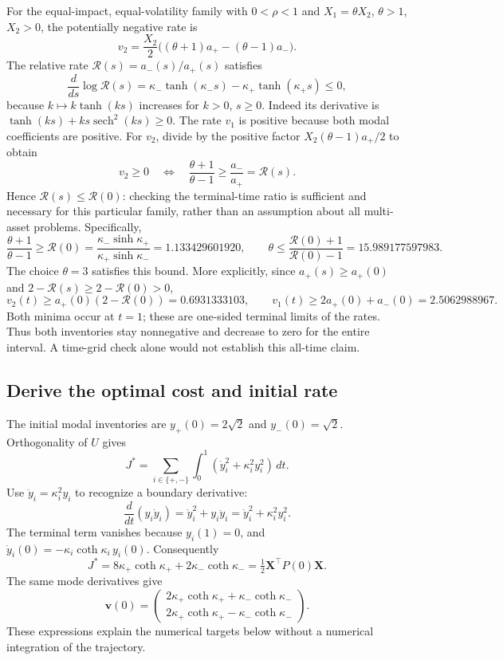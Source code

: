 \documentclass[11pt,a4paper]{article}
\begin{document}
For the equal-impact, equal-volatility family with $0<\rho<1$ and
$X_1=\theta X_2$, $\theta>1$, $X_2>0$, the potentially negative rate is
\[
 v_2=\frac{X_2}{2}\big((\theta+1)a_+-(\theta-1)a_-\big).
\]
The relative rate $\mathcal R(s)=a_-(s)/a_+(s)$ satisfies
\[
 \frac{d}{ds}\log \mathcal R(s)
 =\kappa_-\tanh(\kappa_-s)-\kappa_+\tanh(\kappa_+s)\le0,
\]
because $k\mapsto k\tanh(ks)$ increases for $k>0$, $s\ge0$.
Indeed its derivative is
$\tanh(ks)+ks\operatorname{sech}^2(ks)\ge0$.
The rate $v_1$ is positive because both modal coefficients are positive.
For $v_2$, divide by the positive factor
$X_2(\theta-1)a_+/2$ to obtain
\[
 v_2\ge0\quad\Longleftrightarrow\quad
 \frac{\theta+1}{\theta-1}\ge\frac{a_-}{a_+}=\mathcal R(s).
\]
Hence $\mathcal R(s)\le \mathcal R(0)$: checking the terminal-time ratio is sufficient and
necessary for this particular family, rather than an assumption about all
multi-asset problems. Specifically,
\begin{equation}
 \frac{\theta+1}{\theta-1}\ge
 \mathcal R(0)=\frac{\kappa_-\sinh\kappa_+}{\kappa_+\sinh\kappa_-}
 =1.133429601920,
 \qquad
 \theta\le\frac{\mathcal R(0)+1}{\mathcal R(0)-1}=15.989177597983.
 \label{eq:stage3-bound}
\end{equation}
The choice $\theta=3$ satisfies this bound. More explicitly, since
$a_+(s)\ge a_+(0)$ and $2-\mathcal R(s)\ge2-\mathcal R(0)>0$,
\[
 v_2(t)\ge a_+(0)(2-\mathcal R(0))=0.6931333103,
 \qquad v_1(t)\ge2a_+(0)+a_-(0)=2.5062988967.
\]
Both minima occur at $t=1$; these are one-sided terminal limits of the rates.
Thus both inventories stay nonnegative and decrease to zero for the entire
interval. A time-grid check alone would not establish this all-time claim.

\subsection*{Derive the optimal cost and initial rate}

The initial modal inventories are $y_+(0)=2\sqrt2$ and
$y_-(0)=\sqrt2$. Orthogonality of $U$ gives
\[
 J^*=\sum_{i\in\{+,-\}}\int_0^1
 (\dot y_i^2+\kappa_i^2y_i^2)\,dt.
\]
Use $\ddot y_i=\kappa_i^2y_i$ to recognize a boundary derivative:
\[
 \frac{d}{dt}(y_i\dot y_i)=\dot y_i^2+y_i\ddot y_i
 =\dot y_i^2+\kappa_i^2y_i^2.
\]
The terminal term vanishes because $y_i(1)=0$, and
$\dot y_i(0)=-\kappa_i\coth\kappa_i\,y_i(0)$. Consequently
\begin{equation}
 \boxed{J^*=8\kappa_+\coth\kappa_+
              +2\kappa_-\coth\kappa_-
 =\tfrac12\mathbf X^\top P(0)\mathbf X.}
 \label{eq:stage3-cost}
\end{equation}
The same mode derivatives give
\[
 \mathbf v(0)=
 \begin{pmatrix}
 2\kappa_+\coth\kappa_++\kappa_-\coth\kappa_-\\
 2\kappa_+\coth\kappa_+-\kappa_-\coth\kappa_-
 \end{pmatrix}.
\]
These expressions explain the numerical targets below without a
numerical integration of the trajectory.
\end{document}
